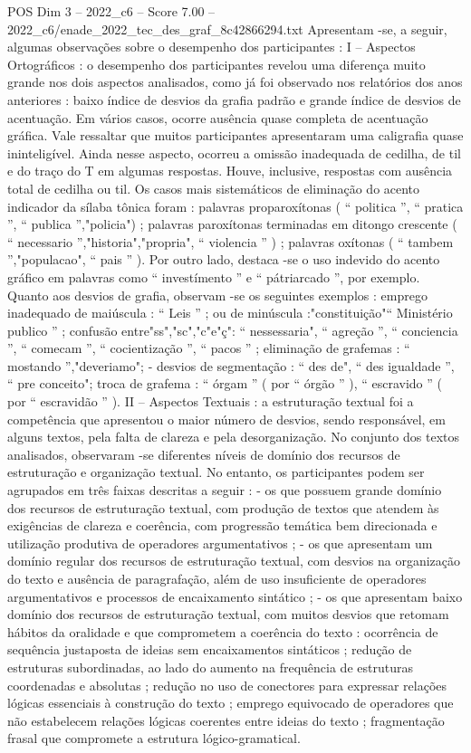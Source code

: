 \begin{textsample}{POS Dim 3 – 2022\_c6 – Score 7.00 – 2022\_c6/enade\_2022\_tec\_des\_graf\_8c42866294.txt}
Apresentam -se, a seguir, algumas observações sobre o desempenho dos participantes : I – Aspectos Ortográficos : o desempenho dos participantes revelou uma diferença muito grande nos dois aspectos analisados, como já foi observado nos relatórios dos anos anteriores : baixo índice de desvios da grafia padrão e grande índice de desvios de acentuação.
Em vários casos, ocorre ausência quase completa de acentuação gráfica.
Vale ressaltar que muitos participantes apresentaram uma caligrafia quase ininteligível.
Ainda nesse aspecto, ocorreu a omissão inadequada de cedilha, de til e do traço do T em algumas respostas.
Houve, inclusive, respostas com ausência total de cedilha ou til.
Os casos mais sistemáticos de eliminação do acento indicador da sílaba tônica foram : palavras proparoxítonas ( “ politica ”, “ pratica ”, “ publica ”,"policia") ; palavras paroxítonas terminadas em ditongo crescente ( “ necessario ”,"historia","propria", “ violencia ” ) ; palavras oxítonas ( “ tambem ”,"populacao", “ pais ” ).
Por outro lado, destaca -se o uso indevido do acento gráfico em palavras como “ investímento ” e “ pátriarcado ”, por exemplo.
Quanto aos desvios de grafia, observam -se os seguintes exemplos : emprego inadequado de maiúscula : “ Leis ” ; ou de minúscula :"constituição"“ Ministério publico ” ; confusão entre"ss","sc","c"e"ç": “ nessessaria", “ agreção ”, “ conciencia ”, “ comecam ”, “ cocientização ”, “ pacos ” ; eliminação de grafemas : “ mostando ”,"deveriamo"; - desvios de segmentação : “ des de", “ des igualdade ”, “ pre conceito"; troca de grafema : “ órgam ” ( por “ órgão ” ), “ escravido ” ( por “ escravidão ” ).
II – Aspectos Textuais : a estruturação textual foi a competência que apresentou o maior número de desvios, sendo responsável, em alguns textos, pela falta de clareza e pela desorganização.
No conjunto dos textos analisados, observaram -se diferentes níveis de domínio dos recursos de estruturação e organização textual.
No entanto, os participantes podem ser agrupados em três faixas descritas a seguir : - os que possuem grande domínio dos recursos de estruturação textual, com produção de textos que atendem às exigências de clareza e coerência, com progressão temática bem direcionada e utilização produtiva de operadores argumentativos ; - os que apresentam um domínio regular dos recursos de estruturação textual, com desvios na organização do texto e ausência de paragrafação, além de uso insuficiente de operadores argumentativos e processos de encaixamento sintático ; - os que apresentam baixo domínio dos recursos de estruturação textual, com muitos desvios que retomam hábitos da oralidade e que comprometem a coerência do texto : ocorrência de sequência justaposta de ideias sem encaixamentos sintáticos ; redução de estruturas subordinadas, ao lado do aumento na frequência de estruturas coordenadas e absolutas ; redução no uso de conectores para expressar relações lógicas essenciais à construção do texto ; emprego equivocado de operadores que não estabelecem relações lógicas coerentes entre ideias do texto ; fragmentação frasal que compromete a estrutura lógico-gramatical.

\end{textsample}
